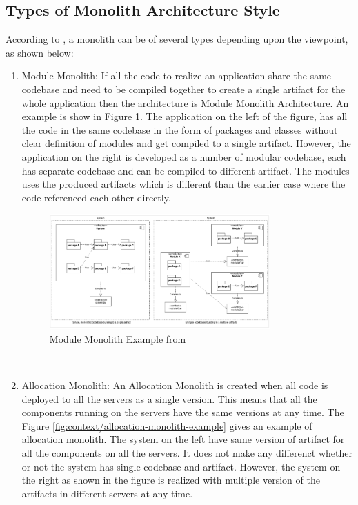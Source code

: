 \subsection{Types of Monolith Architecture Style}\label{subsection:context/monolith-types}
According to \cite{Annett:2014aa}, a monolith can be of several types depending upon the viewpoint, as shown below:
\begin{enumerate}
\item Module Monolith: If all the code to realize an application share the same codebase and need to be compiled together to create a single artifact for the whole application then the architecture is Module Monolith Architecture. An example is show in Figure \ref {fig:context/module-monolith-example}. The application on the left of the figure, has all the code in the same codebase in the form of packages and classes without clear definition of modules and get compiled to a single artifact. However, the application on the right is developed as a number of modular codebase, each has separate codebase and can be compiled to different artifact. The modules uses the produced artifacts which is different than the earlier case where the code referenced each other directly.
\begin{figure}[H]
\begin{center}
\includegraphics[width=0.8\textwidth]{figures/context-module-monolith}
\caption{Module Monolith Example from \cite{Annett:2014aa}}
\label{fig:context/module-monolith-example}
\end{center}
\end{figure}
\\
\item Allocation Monolith: An Allocation Monolith is created when all code is deployed to all the servers as a single version. This means that all the components running on the servers have the same versions at any time. The Figure \ref{fig:context/allocation-monolith-example} gives an example of allocation monolith. The system on the left have same version of artifact for all the components on all the servers. It does not make any differenct whether or not the system has single codebase and artifact. However, the system on the right as shown in the figure is realized with multiple version of the artifacts in different servers at any time.

\end{enumerate}
